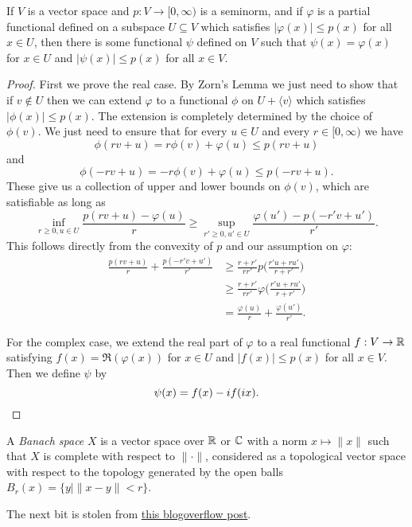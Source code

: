 \begin{thm} If $V$ is a vector space and $p : V \rightarrow [0,\infty)$ is a seminorm, and if $\varphi$ is a partial functional defined on a subspace $U \subseteq V$ which satisfies $|\varphi(x)| \le p(x)$ for all $x \in U$, then there is some functional $\psi$ defined on $V$ such that $\psi(x) = \varphi(x)$ for $x \in U$ and $|\psi(x)| \le p(x)$ for all $x \in V$.
\end{thm}
\begin{proof} First we prove the real case. By Zorn's Lemma we just need to show that if $v \not\in U$ then we can extend $\varphi$ to a functional $\phi$ on $U + \langle v \rangle$ which satisfies $|\phi(x)| \le p(x)$. The extension is completely determined by the choice of $\phi(v)$. We just need to ensure that for every $u \in U$ and every $r \in [0,\infty)$ we have
\[
\phi(rv + u) = r\phi(v) + \varphi(u) \le p(rv + u)
\]
and
\[
\phi(-rv + u) = -r\phi(v) + \varphi(u) \le p(-rv + u).
\]
These give us a collection of upper and lower bounds on $\phi(v)$, which are satisfiable as long as
\[
\inf_{r\ge 0, u \in U} \frac{p(rv + u) - \varphi(u)}{r} \ge \sup_{r' \ge 0, u' \in U} \frac{\varphi(u') - p(-r'v + u')}{r'}.
\]
This follows directly from the convexity of $p$ and our assumption on $\varphi$:
\begin{align*}
\frac{p(rv + u)}{r} + \frac{p(-r'v + u')}{r'} &\ge \frac{r + r'}{rr'}p\Big(\frac{r'u + ru'}{r + r'}\Big)\\
&\ge \frac{r + r'}{rr'}\varphi\Big(\frac{r'u + ru'}{r + r'}\Big)\\
&= \frac{\varphi(u)}{r} + \frac{\varphi(u')}{r'}.
\end{align*}

For the complex case, we extend the real part of $\varphi$ to a real functional $f : V \rightarrow \mathbb{R}$ satisfying $f(x) = \Re(\varphi(x))$ for $x \in U$ and $|f(x)| \le p(x)$ for all $x \in V$. Then we define $\psi$ by
\[
\psi(x) = f(x) - if(ix).\qedhere
\]
\end{proof}

\begin{defn} A \emph{Banach space} $X$ is a vector space over $\mathbb{R}$ or $\mathbb{C}$ with a norm $x \mapsto \|x\|$ such that $X$ is complete with respect to $\|\cdot\|$, considered as a topological vector space with respect to the topology generated by the open balls $B_r(x) = \{y \mid \|x-y\| < r\}$.
\end{defn}

The next bit is stolen from \href{https://math.blogoverflow.com/2014/06/25/zabreikos-lemma-and-four-fundamental-theorems-of-functional-analysis/}{this blogoverflow post}.

